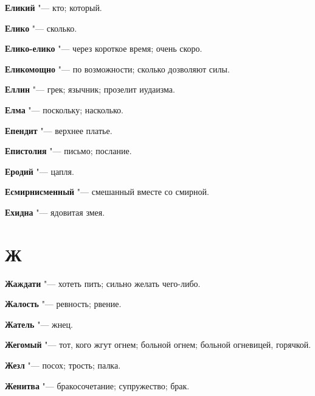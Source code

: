 \begin{mymulticols}{2}
\noindent\textbf{Еликий} "--- кто; который. 




\noindent\textbf{Елико} "--- сколько. 




\noindent\textbf{Елико-елико} "--- через короткое время; очень скоро. 




\noindent\textbf{Еликомощно} "--- по возможности; сколько дозволяют силы. 




\noindent\textbf{Еллин} "--- грек; язычник; прозелит иудаизма. 




\noindent\textbf{Елма} "--- поскольку; насколько. 




\noindent\textbf{Епендит} "--- верхнее платье. 




\noindent\textbf{Епистолия} "--- письмо; послание. 




\noindent\textbf{Еродий} "--- цапля. 




\noindent\textbf{Есмирнисменный} "--- смешанный вместе со смирной. 




\noindent\textbf{Ехидна} "--- ядовитая змея. 




\section{Ж} 





\noindent\textbf{Жаждати} "--- хотеть пить; сильно желать чего-либо. 




\noindent\textbf{Жалость} "--- ревность; рвение. 




\noindent\textbf{Жатель} "--- жнец. 




\noindent\textbf{Жегомый} "--- тот, кого жгут огнем; больной огнем; больной огневицей, горячкой. 




\noindent\textbf{Жезл} "--- посох; трость; палка. 




\noindent\textbf{Женитва} "--- бракосочетание; супружество; брак. 





\end{mymulticols}
